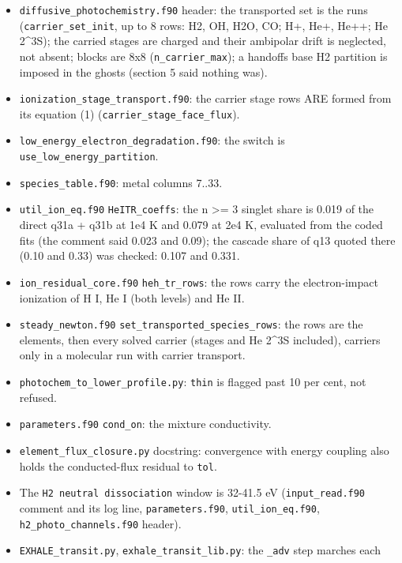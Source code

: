 \documentclass[english,a4paper]{my_memo}
\providecommand{\tightlist}{\setlength{\itemsep}{0pt}\setlength{\parskip}{0pt}}
\begin{document}
\begin{itemize}
\tightlist
\item
  \texttt{diffusive\_photochemistry.f90} header: the transported set is the run\textquotesingle s
  (\texttt{carrier\_set\_init}, up to 8 rows: H2, OH, H2O, CO; H+, He+, He++; He 2\^{}3S);
  the carried stages are charged and their ambipolar drift is neglected, not
  absent; blocks are 8x8 (\texttt{n\_carrier\_max}); a handoff\textquotesingle s base H2 partition is
  imposed in the ghosts (section 5 said nothing was).
\item
  \texttt{ionization\_stage\_transport.f90}: the carrier stage rows ARE formed from
  its equation (1) (\texttt{carrier\_stage\_face\_flux}).
\item
  \texttt{low\_energy\_electron\_degradation.f90}: the switch is
  \texttt{use\_low\_energy\_partition}.
\item
  \texttt{species\_table.f90}: metal columns 7..33.
\item
  \texttt{util\_ion\_eq.f90} \texttt{HeITR\_coeffs}: the n \textgreater= 3 singlet share is 0.019 of the
  direct q31a + q31b at 1e4 K and 0.079 at 2e4 K, evaluated from the coded
  fits (the comment said 0.023 and 0.09); the cascade share of q13 quoted
  there (0.10 and 0.33) was checked: 0.107 and 0.331.
\item
  \texttt{ion\_residual\_core.f90} \texttt{heh\_tr\_rows}: the rows carry the electron-impact
  ionization of H I, He I (both levels) and He II.
\item
  \texttt{steady\_newton.f90} \texttt{set\_transported\_species\_rows}: the rows are the
  elements, then every solved carrier (stages and He 2\^{}3S included), carriers
  only in a molecular run with carrier transport.
\item
  \texttt{photochem\_to\_lower\_profile.py}: \texttt{thin} is flagged past 10 per cent, not
  refused.
\item
  \texttt{parameters.f90} \texttt{cond\_on}: the mixture conductivity.
\item
  \texttt{element\_flux\_closure.py} docstring: convergence with energy coupling also
  holds the conducted-flux residual to \texttt{tol}.
\item
  The \texttt{H2\ neutral\ dissociation} window is 32-41.5 eV (\texttt{input\_read.f90}
  comment and its log line, \texttt{parameters.f90}, \texttt{util\_ion\_eq.f90},
  \texttt{h2\_photo\_channels.f90} header).
\item
  \texttt{EXHALE\_transit.py}, \texttt{exhale\_transit\_lib.py}: the \texttt{\_adv} step marches each

\end{itemize}
\end{document}
